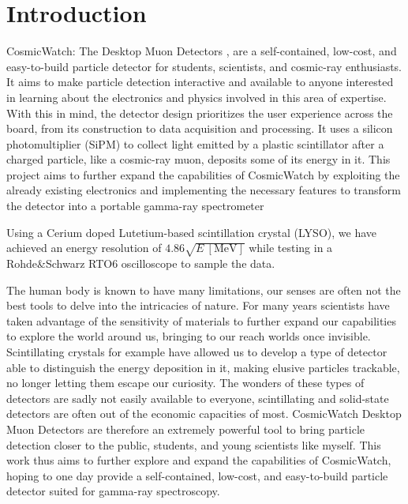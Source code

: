 \chapter{Introduction}

CosmicWatch: The Desktop Muon Detectors \cite{axani2019physics}, are a self-contained, low-cost, and easy-to-build particle detector for students, scientists, and cosmic-ray enthusiasts. It aims to make particle detection interactive and available to anyone interested in learning about the electronics and physics involved in this area of expertise. With this in mind, the detector design prioritizes the user experience across the board, from its construction to data acquisition and processing. It uses a silicon photomultiplier (SiPM) to collect light emitted by a plastic scintillator after a charged particle, like a cosmic-ray muon, deposits some of its energy in it. This project aims to further expand the capabilities of CosmicWatch by exploiting the already existing electronics and implementing the necessary features to transform the detector into a portable gamma-ray spectrometer

Using a Cerium doped Lutetium-based scintillation crystal (LYSO), we have achieved an energy resolution of  $4.86 \sqrt{E~[\unit{\MeV}]}$ while testing in a Rohde\&Schwarz RTO6 oscilloscope to sample the data.

The human body is known to have many limitations, our senses are often not the best tools to delve into the intricacies of nature. For many years scientists have taken advantage of the sensitivity of materials to further expand our capabilities to explore the world around us, bringing to our reach worlds once invisible. Scintillating crystals for example have allowed us to develop a type of detector able to distinguish the energy deposition in it, making elusive particles trackable, no longer letting them escape our curiosity. The wonders of these types of detectors are sadly not easily available to everyone, scintillating and solid-state detectors are often out of the economic capacities of most. CosmicWatch Desktop Muon Detectors are therefore an extremely powerful tool to bring particle detection closer to the public, students, and young scientists like myself. This work thus aims to further explore and expand the capabilities of CosmicWatch, hoping to one day provide a self-contained, low-cost, and easy-to-build particle detector suited for gamma-ray spectroscopy.